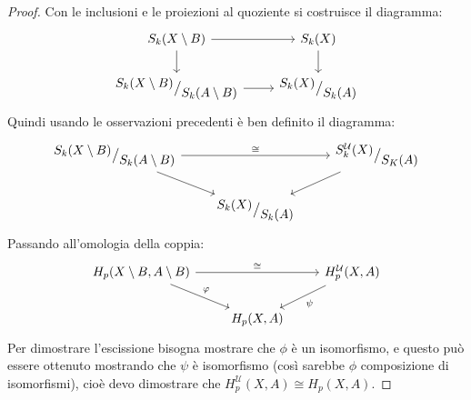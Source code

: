 \begin{proof}
  Con le inclusioni e le proiezioni al quoziente si costruisce il diagramma:
  \[
    \begin{tikzcd}
      S_k(X \setminus B) \rar \dar & S_k(X) \dar \\
      \quot{S_k(X \setminus B)}{S_k(A \setminus B)} \rar & \quot{S_k(X)}{S_k(A)}
    \end{tikzcd}
  \]
  Quindi usando le osservazioni precedenti è ben definito il diagramma:
  \[
    \begin{tikzcd}
      \quot{S_k(X \setminus B)}{S_k(A \setminus B)} \arrow{rd}{} \arrow{rr}{\cong} & {} & \quot{S_k^\mathcal{U}(X)}{S_K(A)} \arrow{ld}{}\\
      {} & \quot{S_k(X)}{S_k(A)} & {}
    \end{tikzcd}
  \]
  Passando all'omologia della coppia:
  \[
    \begin{tikzcd}
      H_p(X \setminus B, A \setminus B) \arrow{rd}{\phi} \arrow{rr}{\cong} & {} & H_p^\mathcal{U}(X,A) \arrow{ld}{\psi} \\
      {} & H_p(X,A) & {}
    \end{tikzcd}
  \]
  Per dimostrare l'escissione bisogna mostrare che $ \phi $ è un isomorfismo, e questo può essere
  ottenuto mostrando che $ \psi $ è isomorfismo (così sarebbe $ \phi $ composizione di isomorfismi),
  cioè devo dimostrare che $ H_p^\mathcal{U}(X, A) \cong H_p(X,A) $.


\end{proof}
